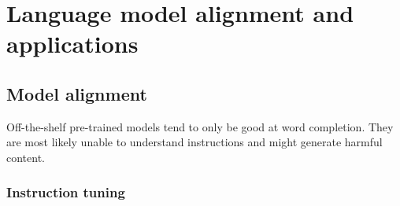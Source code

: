 \chapter{Language model alignment and applications}


\section{Model alignment}

\begin{remark}
    Off-the-shelf pre-trained models tend to only be good at word completion. They are most likely unable to understand instructions and might generate harmful content.
\end{remark}


\subsection{Instruction tuning}

